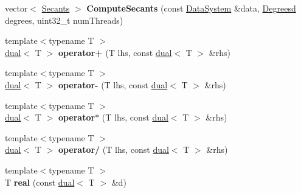 \begin{DoxyCompactItemize}
\item 
\hypertarget{namespace_d_r_d_s_p_a662a111fcbcac315ab1328f24e649244}{vector$<$ \hyperlink{struct_d_r_d_s_p_1_1_secants}{Secants} $>$ {\bfseries Compute\-Secants} (const \hyperlink{struct_d_r_d_s_p_1_1_data_system}{Data\-System} \&data, \hyperlink{struct_d_r_d_s_p_1_1_degrees}{Degreesd} degrees, uint32\-\_\-t num\-Threads)}\label{namespace_d_r_d_s_p_a662a111fcbcac315ab1328f24e649244}

\item 
\hypertarget{namespace_d_r_d_s_p_a41e212998eec3d5560efd1ab35f6bea6}{{\footnotesize template$<$typename T $>$ }\\\hyperlink{struct_d_r_d_s_p_1_1dual}{dual}$<$ T $>$ {\bfseries operator+} (T lhs, const \hyperlink{struct_d_r_d_s_p_1_1dual}{dual}$<$ T $>$ \&rhs)}\label{namespace_d_r_d_s_p_a41e212998eec3d5560efd1ab35f6bea6}

\item 
\hypertarget{namespace_d_r_d_s_p_a84c69656b8267d0386e5d08c6deea1c0}{{\footnotesize template$<$typename T $>$ }\\\hyperlink{struct_d_r_d_s_p_1_1dual}{dual}$<$ T $>$ {\bfseries operator-\/} (T lhs, const \hyperlink{struct_d_r_d_s_p_1_1dual}{dual}$<$ T $>$ \&rhs)}\label{namespace_d_r_d_s_p_a84c69656b8267d0386e5d08c6deea1c0}

\item 
\hypertarget{namespace_d_r_d_s_p_a0828787e24d56a8afb23be5c5d0f2a43}{{\footnotesize template$<$typename T $>$ }\\\hyperlink{struct_d_r_d_s_p_1_1dual}{dual}$<$ T $>$ {\bfseries operator$\ast$} (T lhs, const \hyperlink{struct_d_r_d_s_p_1_1dual}{dual}$<$ T $>$ \&rhs)}\label{namespace_d_r_d_s_p_a0828787e24d56a8afb23be5c5d0f2a43}

\item 
\hypertarget{namespace_d_r_d_s_p_a275cdf7c3b5a9ee9966fcef81e599d78}{{\footnotesize template$<$typename T $>$ }\\\hyperlink{struct_d_r_d_s_p_1_1dual}{dual}$<$ T $>$ {\bfseries operator/} (T lhs, const \hyperlink{struct_d_r_d_s_p_1_1dual}{dual}$<$ T $>$ \&rhs)}\label{namespace_d_r_d_s_p_a275cdf7c3b5a9ee9966fcef81e599d78}

\item 
\hypertarget{namespace_d_r_d_s_p_a4eab38618729bd439b92c0686f8835a9}{{\footnotesize template$<$typename T $>$ }\\T {\bfseries real} (const \hyperlink{struct_d_r_d_s_p_1_1dual}{dual}$<$ T $>$ \&d)}\label{namespace_d_r_d_s_p_a4eab38618729bd439b92c0686f8835a9}


\end{DoxyCompactItemize}
